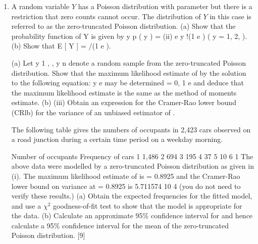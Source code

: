 \documentclass[a4paper,12pt]{article}
\begin{document}
\begin{enumerate}
(i)
\item A random variable $Y$ has a Poisson distribution with parameter but there is a restriction that zero counts cannot occur. The distribution of $Y$ in this case is referred to as the zero-truncated Poisson distribution.
(a)
Show that the probability function of Y is given by
y
p ( y ) =
(ii)
e
y !(1 e )
( y = 1, 2, ).
(b) Show that E [ Y ] = /(1 e ).

(a) Let y 1 , , y n denote a random sample from the zero-truncated Poisson distribution.
Show that the maximum likelihood estimate of by the solution to the following equation:
y
e
may be determined
= 0,
1 e
and deduce that the maximum likelihood estimate is the same as the method of moments estimate.
(b)
(iii)
Obtain an expression for the Cramer-Rao lower bound (CRlb) for the variance of an unbiased estimator of .

The following table gives the numbers of occupants in 2,423 cars observed on a road junction during a certain time period on a weekday morning.

Number of occupants
Frequency of cars
1
1,486
2
694
3
195
4
37
5
10
6
1
The above data were modelled by a zero-truncated Poisson distribution as given in (i).
The maximum likelihood estimate of is = 0.8925 and the Cramer-Rao lower bound on variance at = 0.8925 is 5.711574 10 4 (you do not need to verify these results.)
(a) Obtain the expected frequencies for the fitted model, and use a $\chi^2$ goodness-of-fit test to show that the model is appropriate for the data.
(b) Calculate an approximate 95\% confidence interval for and hence calculate a 95\% confidence interval for the mean of the zero-truncated Poisson distribution.
[9]
\newpage


\end{enumerate}
\end{document}
